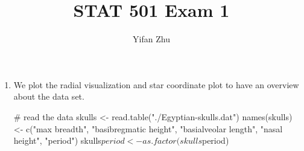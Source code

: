 \documentclass{article}
\begin{document}
	

	
	\title{STAT 501 Exam 1}
	\author{Yifan Zhu}
	\maketitle
	
	\begin{enumerate}[leftmargin = 0 em, label = \arabic*., font = \bfseries]
	\item We plot the radial visualization and star coordinate plot to have an overview about the data set.
	\begin{rcode}
# read the data
skulls <- read.table("./Egyptian-skulls.dat")
names(skulls) <- c("max breadth", "basibregmatic height", "basialveolar length", "nasal height", "period")
skulls$period <- as.factor(skulls$period)


\end{rcode}
\end{enumerate}
\end{document}
